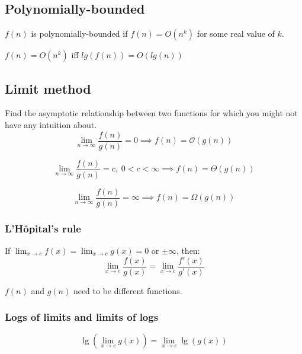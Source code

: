 \subsection{Polynomially-bounded}
    \begin{definition}
        $f(n)$ is polynomially-bounded if $f(n)=O\left(n^k\right)$ for some real value of $k$.
    \end{definition}

    \begin{theorem}
        $f(n)=O\left(n^k\right)$ iff $lg(f(n))=O(lg(n))$
    \end{theorem}

\subsection{Limit method}
    \begin{definition}
        Find the asymptotic relationship between two functions for which you might not have any intuition about. 
        \begin{equation}
            \lim_{n \to \infty} \frac{f(n)}{g(n)} = 0 \implies f(n) = \mathcal{O}(g(n))
        \end{equation}
        
        \begin{equation}
            \lim_{n \to \infty} \frac{f(n)}{g(n)} = c, \; 0 < c < \infty \implies f(n) = \Theta(g(n))
        \end{equation}
        
        \begin{equation}
            \lim_{n \to \infty} \frac{f(n)}{g(n)} = \infty \implies f(n) = \Omega(g(n))
        \end{equation}
    \end{definition}

    \subsubsection{L'Hôpital's rule}
    \begin{definition}
        If $\lim_{x \to c} f(x) = \lim_{x \to c} g(x) = 0$ or $\pm \infty$, then:
        \begin{equation}
            \lim_{x \to c} \frac{f(x)}{g(x)} = \lim_{x \to c} \frac{f'(x)}{g'(x)}
        \end{equation}
        
    \end{definition}

    \begin{warning}
        $f(n)$ and $g(n)$ need to be different functions. 
    \end{warning}

    \subsubsection{Logs of limits and limits of logs}
        \begin{definition}
            \begin{equation}
                \lg \left( \lim_{x \to c} g(x) \right) = \lim_{x \to c} \lg(g(x))
            \end{equation}
        \end{definition}